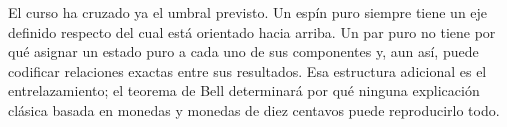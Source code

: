 \begin{classroomqa}
\end{classroomqa}

El curso ha cruzado ya el umbral previsto. Un espín puro siempre tiene un eje definido respecto del cual está orientado hacia arriba. Un par puro no tiene por qué asignar un estado puro a cada uno de sus componentes y, aun así, puede codificar relaciones exactas entre sus resultados. Esa estructura adicional es el entrelazamiento; el teorema de Bell determinará por qué ninguna explicación clásica basada en monedas y monedas de diez centavos puede reproducirlo todo.